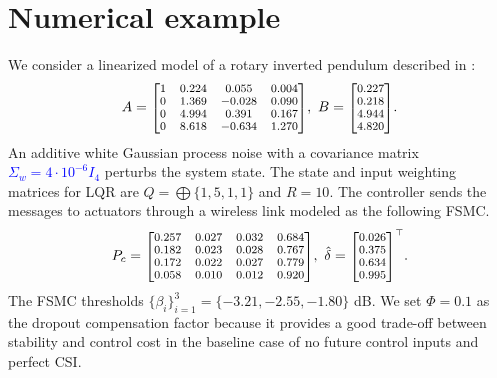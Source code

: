 \documentclass[journal,twoside,web]{ieeecolor}
\begin{document}
\section{Numerical example}\label{sec:example}
We consider a linearized model of a rotary inverted pendulum described in \cite{yZL-2025-automatica}:
\begin{equation*}%
A = \text{\scriptsize $
\begin{bmatrix}
1 & 0.224 & 0.055 & 0.004 \\
0 & 1.369 & -0.028 & 0.090 \\
0 & 4.994 & 0.391 & 0.167 \\
0 & 8.618 & -0.634 & 1.270
\end{bmatrix}$},~
B = \text{\scriptsize $
\begin{bmatrix}
0.227 \\
0.218 \\
4.944 \\
4.820 
\end{bmatrix}
$}.
\end{equation*}
An additive white Gaussian process noise with a covariance matrix \textcolor{blue}{$\Sigma_w \!=\! 4\cdot 10^{-6} I_4$} perturbs the system state. 
The state and input weighting matrices for LQR are $Q = \bigoplus\{1,5,1,1\}$ and $R = 10$.
The controller sends the messages to actuators through a wireless link modeled as the following FSMC.
\begin{equation*}%
P_c = \text{\scriptsize $
\begin{bmatrix}
0.257 & 0.027 & 0.032 & 0.684 \\
0.182 & 0.023 & 0.028 & 0.767 \\
0.172 & 0.022 & 0.027 & 0.779 \\
0.058 & 0.010 & 0.012 & 0.920
\end{bmatrix}$},~
\hat{\delta} = \text{\scriptsize $
\begin{bmatrix}
0.026 \\ 0.375 \\ 0.634 \\ 0.995
\end{bmatrix}^{\top}$}.
\end{equation*}
The FSMC thresholds $\{\beta_i\}_{i=1}^{3} = \{-3.21,-2.55,-1.80\}$ dB.
We set $\mathit{\Phi}=0.1$ as the dropout compensation factor because it provides a good trade-off between stability and control cost in the baseline case of no future control inputs and perfect CSI.
\end{document}
